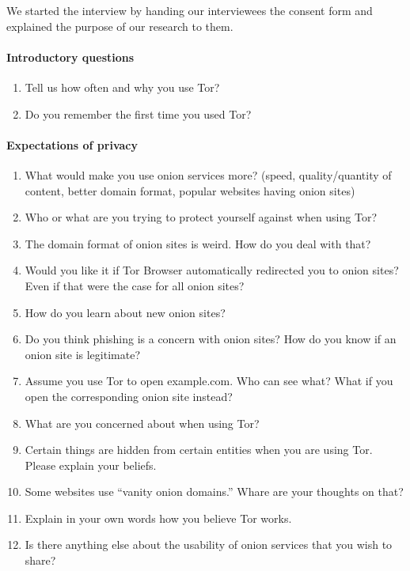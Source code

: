 We started the interview by handing our interviewees the consent form and
explained the purpose of our research to them.

\paragraph{Introductory questions}
\begin{enumerate}
    \item Tell us how often and why you use Tor?
    \item Do you remember the first time you used Tor?
\end{enumerate}

\paragraph{Expectations of privacy}
\begin{enumerate}
    \item What would make you use onion services more? (speed, quality/quantity
        of content, better domain format, popular websites having onion sites)
    \item Who or what are you trying to protect yourself against when using Tor?
    \item The domain format of onion sites is weird.  How do you deal with that?
    \item Would you like it if Tor Browser automatically redirected you to onion
        sites?  Even if that were the case for all onion sites?
    \item How do you learn about new onion sites?
    \item Do you think phishing is a concern with onion sites?  How do you know
        if an onion site is legitimate?
    \item Assume you use Tor to open example.com.  Who can see what?  What if
        you open the corresponding onion site instead?
    \item What are you concerned about when using Tor?
    \item Certain things are hidden from certain entities when you are using
        Tor.  Please explain your beliefs.
    \item Some websites use ``vanity onion domains.''  Whare are your thoughts
        on that?
    \item Explain in your own words how you believe Tor works.
    \item Is there anything else about the usability of onion services that you
        wish to share?
\end{enumerate}

